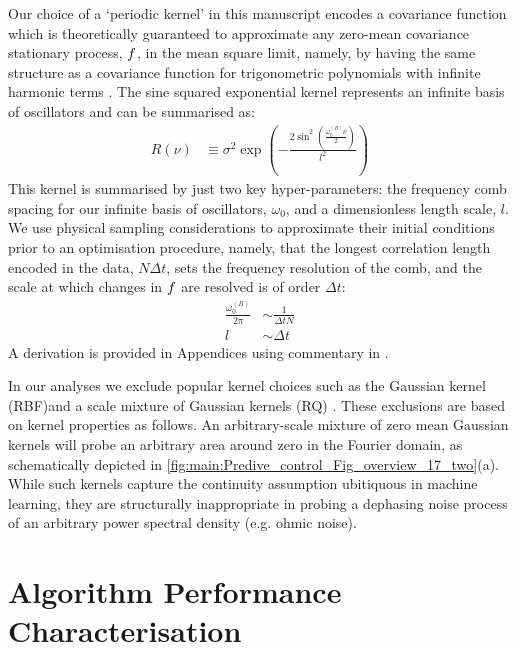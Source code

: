 Our choice of a `periodic kernel' in this manuscript encodes a covariance function which is theoretically guaranteed to approximate any zero-mean covariance stationary process, $f$, in the mean square limit, namely, by having the same structure as a covariance function for trigonometric polynomials with infinite harmonic terms \cite{solin2014explicit, karlin2012first}. The sine squared exponential kernel represents an infinite basis of oscillators and can be summarised as:
\begin{align}
R(\nu) &\equiv \sigma^2 \exp (- \frac{2\sin^2(\frac{\omega_0^{(B)}\nu}{2})}{l^2}) 
\end{align} 
This kernel is summarised by just two key hyper-parameters: the frequency comb spacing for our infinite basis of oscillators, $\omega_0$, and a dimensionless length scale, $l$. We use physical sampling considerations to approximate their initial conditions prior to an optimisation procedure, namely, that the longest correlation length encoded in the data, $N \Delta t $, sets the frequency resolution of the comb, and the scale at which changes in $f$ are resolved is of order $\Delta t$:
\begin{align}
\frac{\omega_0^{(B)}}{2\pi} & \sim  \frac{1}{\Delta t N} \\
l & \sim \Delta t
\end{align} 
A derivation is provided in Appendices using commentary in \cite{solin2014explicit}.

In our analyses we exclude popular kernel choices such as the Gaussian kernel (RBF)and  a scale mixture of Gaussian kernels (RQ) \cite{rasmussen2005gaussian, tobar2015learning}. These exclusions are based on kernel properties as follows. An arbitrary-scale mixture of zero mean Gaussian kernels will probe an arbitrary area around zero in the Fourier domain, as schematically depicted in \cref{fig:main:Predive_control_Fig_overview_17_two}(a). While such kernels capture the continuity assumption ubitiquous in machine learning, they are structurally inappropriate in probing a dephasing noise process of an arbitrary power spectral density (e.g. ohmic noise).  


\section{Algorithm Performance Characterisation \label{sec:main:Performance}}

